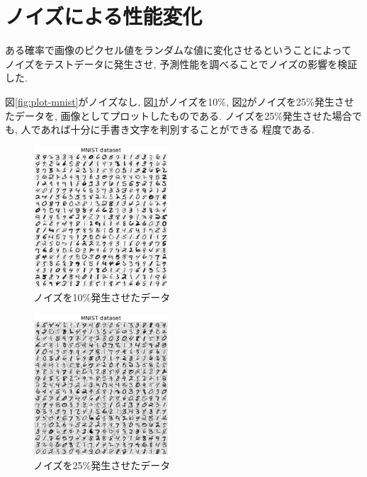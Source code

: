\documentclass[10pt,a4paper,twocolumn]{jarticle}
\begin{document}

\section{ノイズによる性能変化}
ある確率で画像のピクセル値をランダムな値に変化させるということによって
ノイズをテストデータに発生させ, 予測性能を調べることでノイズの影響を検証した. 

図\ref{fig:plot-mnist}がノイズなし, 
図\ref{fig:noise-0.1}がノイズを10\%,
図\ref{fig:noise-0.25}がノイズを25\%発生させたデータを, 
画像としてプロットしたものである. 
ノイズを25\%発生させた場合でも, 人であれば十分に手書き文字を判別することができる
程度である. 
\begin{figure}[htbp]
  \centering
  \includegraphics[width=0.45\textwidth]{assets/img/tiled_mnist_nl0.1.eps}
  \caption{ノイズを10\%発生させたデータ}
  \label{fig:noise-0.1}
\end{figure}
\begin{figure}[htbp]
  \centering
  \includegraphics[width=0.45\textwidth]{assets/img/tiled_mnist_nl0.25.eps}
  \caption{ノイズを25\%発生させたデータ}
  \label{fig:noise-0.25}
\end{figure}
\end{document}
